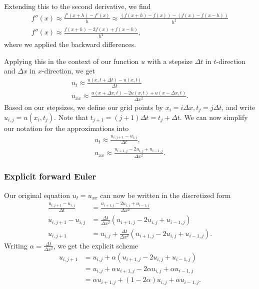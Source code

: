 \documentclass{article}
\theoremstyle{definition}
\begin{document}
Extending this to the second derivative, we find
\begin{gather*}
    f''(x) \approx \frac{f'(x + h) - f'(x)}{h} \approx \frac{\left( f(x + h) - f(x) \right) - \left( f(x) - f(x - h) \right)}{h^2} \\
    f''(x) \approx \frac{f(x + h) - 2f(x) + f(x - h)}{h^2},
\end{gather*}
where we applied the backward differences.

Applying this in the context of our function $u$ with a stepsize $\Delta t$ in $t$-direction and $\Delta x$ in $x$-direction, we get
\begin{gather*}
    u_t \approx \frac{u(x, t + \Delta t) - u(x,t)}{\Delta t} \\
    u_{xx} \approx \frac{u(x + \Delta x, t) - 2u(x, t) + u(x - \Delta x, t)}{\Delta x^2}.
\end{gather*}
Based on our stepsizes, we define our grid points by $x_i = i \Delta x, t_j = j\Delta t$, and write $u_{i,j} = u(x_i, t_j)$. Note that $t_{j+1} = (j + 1)\Delta t = t_j + \Delta t$. We can now simplify our notation for the approximations into
\begin{gather*}
    u_t \approx \frac{u_{i, j+1} - u_{i,j}}{\Delta t}, \\
    u_{xx} \approx \frac{u_{i+1,j} - 2u_{i,j} + u_{i-1,j}}{\Delta x^2}.
\end{gather*}

\subsubsection{Explicit forward Euler}
Our original equation $u_t = u_{xx}$ can now be written in the discretized form
\begin{align*}
    \frac{u_{i, j+1} - u_{i,j}}{\Delta t} &= \frac{u_{i+1,j} - 2u_{i,j} + u_{i-1,j}}{\Delta x^2} \\
    u_{i, j+1} - u_{i,j} &= \frac{\Delta t}{\Delta x^2} \left( u_{i+1,j} - 2u_{i,j} + u_{i-1,j} \right) \\
    u_{i, j+1} &= u_{i,j} + \frac{\Delta t}{\Delta x^2} \left( u_{i+1,j} - 2u_{i,j} + u_{i-1,j} \right).
\end{align*}
Writing $\alpha = \frac{\Delta t}{\Delta x^2}$, we get the explicit scheme
\begin{align*}
    u_{i, j+1} &= u_{i,j} + \alpha \left( u_{i+1,j} - 2u_{i,j} + u_{i-1,j} \right) \tag{\theequation}\label{eq:forwardEuler}\\
    &= u_{i,j} + \alpha u_{i+1,j} - 2\alpha u_{i,j} + \alpha u_{i-1,j} \\
    &= \alpha u_{i+1,j} + (1 - 2\alpha) u_{i,j} + \alpha u_{i-1, j}.
\end{align*}
\end{document}

